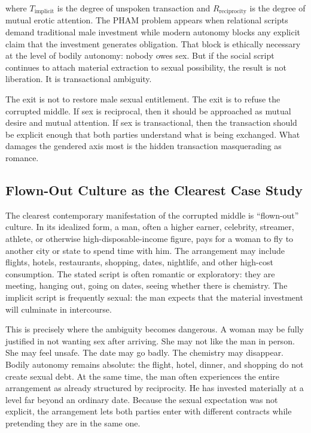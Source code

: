 \documentclass[12pt]{article}
\begin{document}
where $T_{\text{implicit}}$ is the degree of unspoken transaction and $R_{\text{reciprocity}}$ is the degree of mutual erotic attention. The PHAM problem appears when relational scripts demand traditional male investment while modern autonomy blocks any explicit claim that the investment generates obligation. That block is ethically necessary at the level of bodily autonomy: nobody owes sex. But if the social script continues to attach material extraction to sexual possibility, the result is not liberation. It is transactional ambiguity.

The exit is not to restore male sexual entitlement. The exit is to refuse the corrupted middle. If sex is reciprocal, then it should be approached as mutual desire and mutual attention. If sex is transactional, then the transaction should be explicit enough that both parties understand what is being exchanged. What damages the gendered axis most is the hidden transaction masquerading as romance.

\subsection{Flown-Out Culture as the Clearest Case Study}

The clearest contemporary manifestation of the corrupted middle is ``flown-out'' culture. In its idealized form, a man, often a higher earner, celebrity, streamer, athlete, or otherwise high-disposable-income figure, pays for a woman to fly to another city or state to spend time with him. The arrangement may include flights, hotels, restaurants, shopping, dates, nightlife, and other high-cost consumption. The stated script is often romantic or exploratory: they are meeting, hanging out, going on dates, seeing whether there is chemistry. The implicit script is frequently sexual: the man expects that the material investment will culminate in intercourse.

This is precisely where the ambiguity becomes dangerous. A woman may be fully justified in not wanting sex after arriving. She may not like the man in person. She may feel unsafe. The date may go badly. The chemistry may disappear. Bodily autonomy remains absolute: the flight, hotel, dinner, and shopping do not create sexual debt. At the same time, the man often experiences the entire arrangement as already structured by reciprocity. He has invested materially at a level far beyond an ordinary date. Because the sexual expectation was not explicit, the arrangement lets both parties enter with different contracts while pretending they are in the same one.
\end{document}
